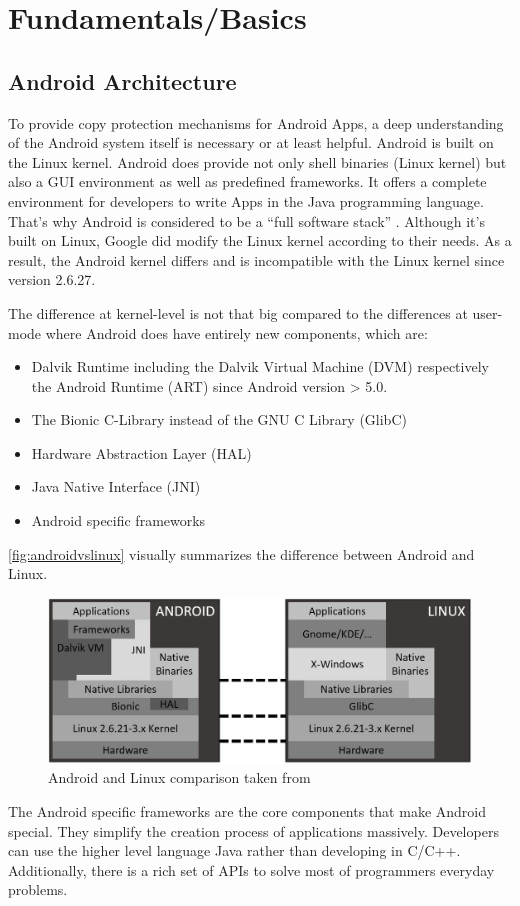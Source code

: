 \chapter{Fundamentals/Basics}\label{chapter:android_basics}

\section{Android Architecture}\label{section:android_architecture}
To provide copy protection mechanisms for Android Apps,
a deep understanding of the Android system itself
is necessary or at least helpful.
Android is built on the Linux kernel. Android does provide not
only shell binaries (Linux kernel) but also a GUI environment
as well as predefined frameworks. It offers a complete environment
for developers to write Apps in the Java programming language.
That's why Android is considered to be a ``full software stack''
\parencite[p.7f]{levin}. Although it's built on Linux,
Google did modify the Linux kernel according to their needs.
As a result, the Android kernel differs and is incompatible
with the Linux kernel since version 2.6.27.

The difference at kernel-level is not that big compared to
the differences at user-mode where Android does have entirely new
components, which are:
\begin{itemize}
\item Dalvik Runtime including the Dalvik Virtual Machine (DVM)
respectively the Android Runtime (ART) since Android version > 5.0.
\item The Bionic C-Library instead of the GNU C Library (GlibC)
\item Hardware Abstraction Layer (HAL)
\item Java Native Interface (JNI)
\item Android specific frameworks
\end{itemize}
\autoref{fig:androidvslinux} visually summarizes the difference
between Android and Linux.
\begin{figure}[htb]
  \includegraphics[width=\textwidth]{figures/androidvslinux}
  \caption[Android vs Linux]{Android and Linux comparison taken from
  ~\parencite[p.9]{levin}}
  \label{fig:androidvslinux}
\end{figure}
The Android specific frameworks are the core components that make Android
special. They simplify the creation process of applications massively.
Developers can use the higher level language Java rather than developing
in C/C++. Additionally, there is a rich set of APIs to solve most of
programmers everyday problems.

